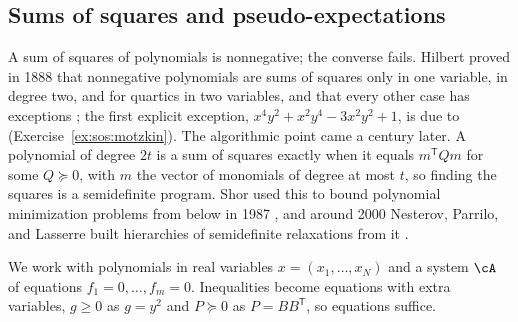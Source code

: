 \begin{refsection}
\subsection{Sums of squares and pseudo-expectations}\label{sec:sos:defs}

A sum of squares of polynomials is nonnegative; the converse fails. Hilbert proved in 1888 that nonnegative polynomials are sums of squares only in one variable, in degree two, and for quartics in two variables, and that every other case has exceptions \parencite{Hilbert1888}; the first explicit exception, $x^4y^2+x^2y^4-3x^2y^2+1$, is due to \textcite{Motzkin1967} (Exercise~\ref{ex:sos:motzkin}). The algorithmic point came a century later. A polynomial of degree $2t$ is a sum of squares exactly when it equals $m^{\mathsf T}Qm$ for some $Q\succeq0$, with $m$ the vector of monomials of degree at most $t$, so finding the squares is a semidefinite program. Shor used this to bound polynomial minimization problems from below in 1987 \parencite{Shor1987}, and around 2000 Nesterov, Parrilo, and Lasserre built hierarchies of semidefinite relaxations from it \parencite{Nesterov2000,Parrilo2000,Lasserre2001}.

We work with polynomials in real variables $x=(x_1,\dots,x_N)$ and a system $\cA$ of equations $f_1=0,\dots,f_m=0$. Inequalities become equations with extra variables, $g\ge0$ as $g=y^2$ and $P\succeq0$ as $P=BB^{\mathsf T}$, so equations suffice.



\end{refsection}
